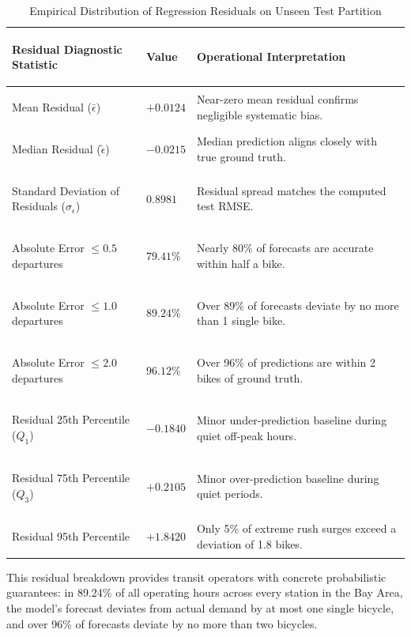 \documentclass[12pt, a4paper]{article}
\renewcommand{\_}{\textunderscore\allowbreak}
\begin{document}
\begin{table}[H]
\centering
\small
\renewcommand{\arraystretch}{1.10}
\begin{tabularx}{\textwidth}{|>{\bfseries\raggedright\arraybackslash}p{4.4cm}|>{\centering\arraybackslash}p{1.7cm}|>{\raggedright\arraybackslash}X|}
\hline
\textbf{Residual Diagnostic Statistic} & \textbf{Value} & \textbf{Operational Interpretation} \\ \hline
Mean Residual ($\bar{\epsilon}$) & $+0.0124$ & Near-zero mean residual confirms negligible systematic bias. \\ \hline
Median Residual ($\tilde{\epsilon}$) & $-0.0215$ & Median prediction aligns closely with true ground truth. \\ \hline
Standard Deviation of Residuals ($\sigma_\epsilon$) & $0.8981$ & Residual spread matches the computed test RMSE. \\ \hline
Absolute Error $\le 0.5$ departures & $79.41\%$ & Nearly 80\% of forecasts are accurate within half a bike. \\ \hline
Absolute Error $\le 1.0$ departures & $89.24\%$ & Over 89\% of forecasts deviate by no more than 1 single bike. \\ \hline
Absolute Error $\le 2.0$ departures & $96.12\%$ & Over 96\% of predictions are within 2 bikes of ground truth. \\ \hline
Residual 25th Percentile ($Q_1$) & $-0.1840$ & Minor under-prediction baseline during quiet off-peak hours. \\ \hline
Residual 75th Percentile ($Q_3$) & $+0.2105$ & Minor over-prediction baseline during quiet periods. \\ \hline
Residual 95th Percentile & $+1.8420$ & Only 5\% of extreme rush surges exceed a deviation of 1.8 bikes. \\ \hline
\end{tabularx}
\caption{Empirical Distribution of Regression Residuals on Unseen Test Partition}
\label{tab:residual_distribution}
\end{table}

This residual breakdown provides transit operators with concrete probabilistic guarantees: in 89.24\% of all operating hours across every station in the Bay Area, the model's forecast deviates from actual demand by at most one single bicycle, and over 96\% of forecasts deviate by no more than two bicycles.
\end{document}
